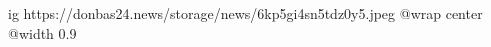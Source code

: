  
 
 
 
 

\ifcmt
  ig https://donbas24.news/storage/news/6kp5gi4sn5tdz0y5.jpeg
  @wrap center
  @width 0.9
\fi

